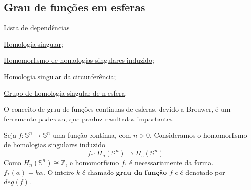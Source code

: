 \subsection{Grau de funções em esferas} %
\label{grau-de-funcoes-em-esferas-def}
\begin{titlemize}{Lista de dependências}
    \item \hyperref[homologia-singular-def]{Homologia singular};\\
    \item \hyperref[homomorfismo-de-homologias-singulares-induzido-prop]{Homomorfismo de homologias singulares induzido};\\
    \item \hyperref[homologia-singular-de-S1-prop]{Homologia singular da circunferência};\\
    \item \hyperref[grupo-de-homologia-singular-de-n-esfera-prop]{Grupo de homologia singular de n-esfera}.
\end{titlemize}

O conceito de grau de funções contínuas de esferas, devido a Brouwer, é um ferramento poderoso, que produz resultados importantes.

\begin{defi}
    Seja $f:\mathbb{S}^n\rightarrow \mathbb{S}^n$ uma função contínua, com $n>0$. Consideramos o homomorfismo de homologias singulares induzido
    \[f_*:H_n(\mathbb{S}^n)\rightarrow H_n(\mathbb{S}^n).\]
    Como $H_n(\mathbb{S}^n)\cong \mathbb{Z}$, o homomorfismo $f_*$ é necessariamente da forma. $f_*(\alpha)=k\alpha$. O inteiro $k$ é chamado \textbf{grau da função} $f$ e é denotado por $deg(f)$.
\end{defi}

